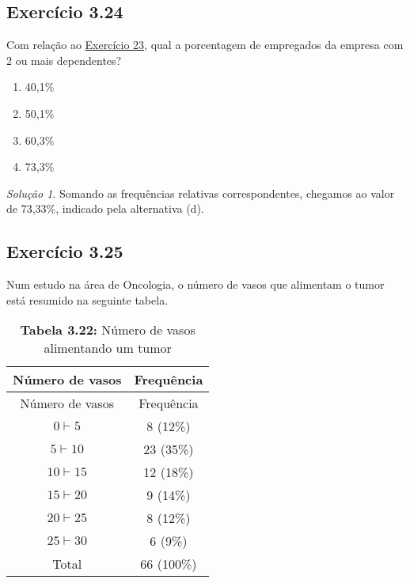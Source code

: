 \documentclass[
]{latex/krantz}
\providecommand{\tightlist}{%
  \setlength{\itemsep}{0pt}\setlength{\parskip}{0pt}}
\theoremstyle{definition}
\theoremstyle{definition}
\theoremstyle{definition}
\theoremstyle{definition}
\theoremstyle{remark}
\newtheorem*{solution}{Solução}
\begin{document}
\hypertarget{exr3-24}{%
\subsection*{Exercício 3.24}\label{exr3-24}}

Com relação ao \protect\hyperlink{exr3-23}{Exercício 23}, qual a porcentagem de empregados da empresa com 2 ou mais dependentes?

\begin{enumerate}
\def\labelenumi{\alph{enumi})}
\tightlist
\item
  40,1\%
\item
  50,1\%
\item
  60,3\%
\item
  73,3\%
\end{enumerate}

\begin{solution}
Somando as frequências relativas correspondentes, chegamos ao valor de 73,33\%, indicado pela alternativa (d).
\end{solution}

\hypertarget{exr3-25}{%
\subsection*{Exercício 3.25}\label{exr3-25}}

Num estudo na área de Oncologia, o número de vasos que alimentam o tumor está resumido na seguinte tabela.

\begin{longtable}[]{@{}cc@{}}
\caption{\textbf{Tabela 3.22:} Número de vasos alimentando um tumor}\tabularnewline
\toprule\noalign{}
Número de vasos & Frequência \\
\midrule\noalign{}
\endfirsthead
\toprule\noalign{}
Número de vasos & Frequência \\
\midrule\noalign{}
\endhead
\bottomrule\noalign{}
\endlastfoot
\(0 \vdash 5\) & 8 (12\%) \\
\(5 \vdash 10\) & 23 (35\%) \\
\(10 \vdash 15\) & 12 (18\%) \\
\(15 \vdash 20\) & 9 (14\%) \\
\(20 \vdash 25\) & 8 (12\%) \\
\(25 \vdash 30\) & 6 (9\%) \\
Total & 66 (100\%) \\
\end{longtable}
\end{document}
